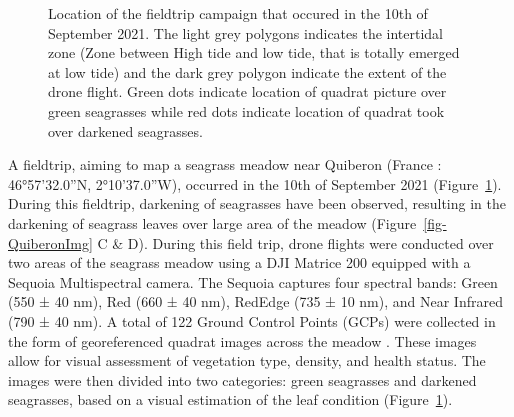 \documentclass[
  number]{elsarticle}
\begin{document}
\label{cell-fig-quiberonMap}
\begin{figure}[H]


\caption{\label{fig-quiberonMap}Location of the fieldtrip campaign that
occured in the 10th of September 2021. The light grey polygons indicates
the intertidal zone (Zone between High tide and low tide, that is
totally emerged at low tide) and the dark grey polygon indicate the
extent of the drone flight. Green dots indicate location of quadrat
picture over green seagrasses while red dots indicate location of
quadrat took over darkened seagrasses.}

\end{figure}%

A fieldtrip, aiming to map a seagrass meadow near Quiberon (France :
46°57'32.0''N, 2°10'37.0''W), occurred in the 10th of September 2021
(Figure~\ref{fig-quiberonMap}). During this fieldtrip, darkening of
seagrasses have been observed, resulting in the darkening of seagrass
leaves over large area of the meadow (Figure~\ref{fig-QuiberonImg} C \&
D). During this field trip, drone flights were conducted over two areas
of the seagrass meadow using a DJI Matrice 200 equipped with a Sequoia
Multispectral camera. The Sequoia captures four spectral bands: Green
(550 ± 40 nm), Red (660 ± 40 nm), RedEdge (735 ± 10 nm), and Near
Infrared (790 ± 40 nm). A total of 122 Ground Control Points (GCPs) were
collected in the form of georeferenced quadrat images across the meadow
. These images allow for visual assessment of vegetation type, density,
and health status. The images were then divided into two categories:
green seagrasses and darkened seagrasses, based on a visual estimation
of the leaf condition (Figure~\ref{fig-quiberonMap}).
\end{document}
